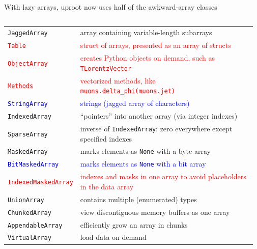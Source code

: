 \documentclass[aspectratio=169]{beamer}
\begin{document}
\begin{frame}{With lazy arrays, uproot now uses half of the awkward-array classes}
\vspace{0.35 cm}
\begin{columns}
\begin{tabular}{p{0.26\linewidth} p{0.71\linewidth}}
\textcolor{mauve}{\texttt{JaggedArray}}        & \textcolor{mauve}{array containing variable-length subarrays} \\
\textcolor{red}{\texttt{Table}}                & \textcolor{red}{struct of arrays, presented as an array of structs} \\
\textcolor{red}{\texttt{ObjectArray}}          & \textcolor{red}{creates Python objects on demand, such as \texttt{TLorentzVector}} \\
\textcolor{red}{\texttt{Methods}}              & \textcolor{red}{vectorized methods, like \texttt{muons.delta_phi(muons.jet)}} \\
\textcolor{blue}{\texttt{StringArray}}         & \textcolor{blue}{strings (jagged array of characters)} \\
\texttt{IndexedArray}                          & ``pointers'' into another array (via integer indexes) \\
\texttt{SparseArray}                           & inverse of {\tt IndexedArray}: zero everywhere except specified indexes \\
\texttt{MaskedArray}                           & marks elements as {\tt None} with a byte array \\
\textcolor{blue}{\texttt{BitMaskedArray}}      & \textcolor{blue}{marks elements as {\tt None} with a bit array} \\
\textcolor{red}{\texttt{IndexedMaskedArray}}   & \textcolor{red}{indexes and masks in one array to avoid placeholders in the data array} \\
\texttt{UnionArray}                            & contains multiple (enumerated) types \\
\textcolor{mauve}{\texttt{ChunkedArray}}       & \textcolor{mauve}{view discontiguous memory buffers as one array} \\
\texttt{AppendableArray}                       & efficiently grow an array in chunks \\
\textcolor{mauve}{\texttt{VirtualArray}}       & \textcolor{mauve}{load data on demand} \\
\end{tabular}


\end{columns}
\end{frame}
\end{document}
